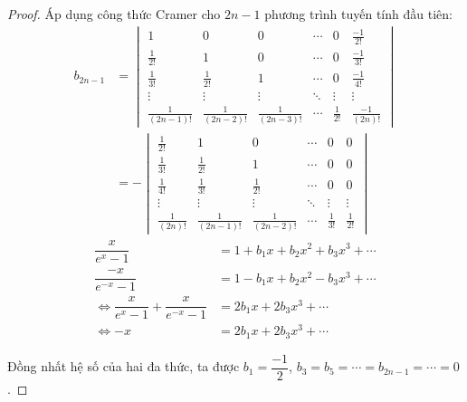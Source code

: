 \documentclass[class=linear-algebra,crop=false]{standalone}
\begin{document}
\begin{proof}
	\par Áp dụng công thức Cramer cho $2n-1$ phương trình tuyến tính đầu tiên:
	\begin{align*}
		b_{2n-1} & =
		\begin{vmatrix}
			1                 & 0                 & 0                 & \cdots & 0            & \frac{-1}{2!}    \\
			\frac{1}{2!}      & 1                 & 0                 & \cdots & 0            & \frac{-1}{3!}    \\
			\frac{1}{3!}      & \frac{1}{2!}      & 1                 & \cdots & 0            & \frac{-1}{4!}    \\
			\vdots            & \vdots            & \vdots            & \ddots & \vdots       & \vdots           \\
			\frac{1}{(2n-1)!} & \frac{1}{(2n-2)!} & \frac{1}{(2n-3)!} & \cdots & \frac{1}{2!} & \frac{-1}{(2n)!}
		\end{vmatrix} \\
		         & = -
		\begin{vmatrix}
			\frac{1}{2!}    & 1                 & 0                 & \cdots & 0            & 0            \\
			\frac{1}{3!}    & \frac{1}{2!}      & 1                 & \cdots & 0            & 0            \\
			\frac{1}{4!}    & \frac{1}{3!}      & \frac{1}{2!}      & \cdots & 0            & 0            \\
			\vdots          & \vdots            & \vdots            & \ddots & \vdots       & \vdots       \\
			\frac{1}{(2n)!} & \frac{1}{(2n-1)!} & \frac{1}{(2n-2)!} & \cdots & \frac{1}{3!} & \frac{1}{2!}
		\end{vmatrix}
	\end{align*}
	\begin{align*}
		\dfrac{x}{e^{x}-1}                                             & = 1 + b_{1}x + b_{2}x^{2} + b_{3}x^{3} + \cdots \\
		\dfrac{-x}{e^{-x}-1}                                           & = 1 - b_{1}x + b_{2}x^{2} - b_{3}x^{3} + \cdots \\
		\Longleftrightarrow \dfrac{x}{e^{x} - 1} + \dfrac{x}{e^{-x}-1} & = 2b_{1}x + 2b_{3}x^{3} + \cdots                \\
		\Longleftrightarrow -x                                         & = 2b_{1}x + 2b_{3}x^{3} + \cdots
	\end{align*}
	\par Đồng nhất hệ số của hai đa thức, ta được $b_{1} = \dfrac{-1}{2}$, $b_{3} = b_{5} = \cdots = b_{2n-1} = \cdots = 0$.

\end{proof}
\end{document}
